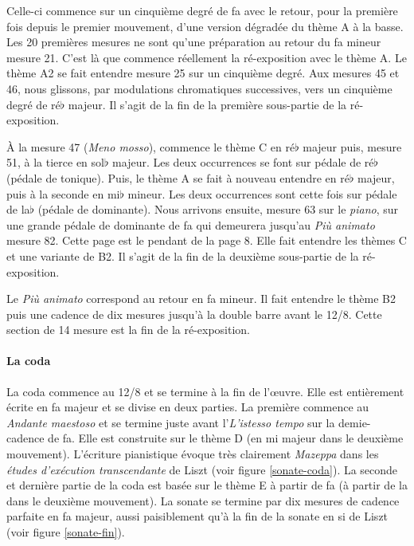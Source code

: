 Celle-ci commence sur un cinquième degré de fa avec le retour, pour la première fois depuis le premier mouvement, d'une version dégradée du thème A à la basse. Les 20 premières mesures ne sont qu'une préparation au retour du fa mineur mesure 21. C'est là que commence réellement la ré-exposition avec le thème A. Le thème A2 se fait entendre mesure 25 sur un cinquième degré. Aux mesures 45 et 46, nous glissons, par modulations chromatiques successives, vers un cinquième degré de ré$\flat$ majeur. Il s'agit de la fin de la première sous-partie de la ré-exposition.

À la mesure 47 (\emph{Meno mosso}), commence le thème C en ré$\flat$ majeur puis, mesure 51, à la tierce en sol$\flat$ majeur. Les deux occurrences se font sur pédale de ré$\flat$ (pédale de tonique). Puis, le thème A se fait à nouveau entendre en ré$\flat$ majeur, puis à la seconde en mi$\flat$ mineur. Les deux occurrences sont cette fois sur pédale de la$\flat$ (pédale de dominante). Nous arrivons ensuite, mesure 63 sur le \emph{piano}, sur une grande pédale de dominante de fa qui demeurera jusqu'au \emph{Più animato} mesure 82. Cette page est le pendant de la page 8. Elle fait entendre les thèmes C et une variante de B2. Il s'agit de la fin de la deuxième sous-partie de la ré-exposition.

Le \emph{Più animato} correspond au retour en fa mineur. Il fait entendre le thème B2 puis une cadence de dix mesures jusqu'à la double barre avant le 12/8. Cette section de 14 mesure est la fin de la ré-exposition.

\newpage

\paragraph{La coda}

La coda commence au 12/8 et se termine à la fin de l'œuvre. Elle est entièrement écrite en fa majeur et se divise en deux parties. La première commence au \emph{Andante maestoso} et se termine juste avant l'\emph{L'istesso tempo} sur la demie-cadence de fa. Elle est construite sur le thème D (en mi majeur dans le deuxième mouvement). L'écriture pianistique évoque très clairement \emph{Mazeppa} dans les \emph{études d'exécution transcendante} de Liszt (voir figure \ref{sonate-coda}). La seconde et dernière partie de la coda est basée sur le thème E à partir de fa (à partir de la dans le deuxième mouvement). La sonate se termine par dix mesures de cadence parfaite en fa majeur, aussi paisiblement qu'à la fin de la sonate en si de Liszt (voir figure \ref{sonate-fin}).\\

